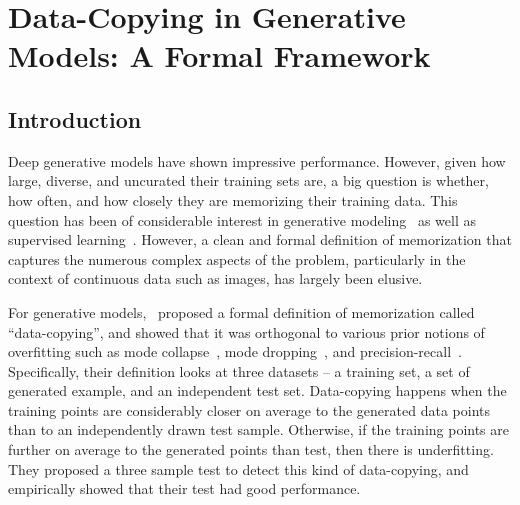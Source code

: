 \graphicspath{{./chapters/chapter4/}}
\newtheorem{theorem}{Theorem}[section]
\newtheorem{proposition}[theorem]{Proposition}
\newtheorem{lemma}[theorem]{Lemma}
\newtheorem{corollary}[theorem]{Corollary}
\newtheorem{definition}[theorem]{Definition}
\newtheorem{assumption}[theorem]{Assumption}
\newtheorem{remark}[theorem]{Remark}

\def\c{cr}
\def\hc{\hat{cr}}
\def\d{\Lambda}
\def\ind{\mathbbm{1}}
\def\oc{Online\_Cluster}
\def\mem{\mathcal M}
\def\E{\mathbb{E}}
\def\R{\mathbb{R}}
\def\O{\mathcal{O}}
\def\calP{\mathcal{P}}
\def\dc{Data\_Copy\_Detect}
\def\a{\kappa}
\def\hq{\widehat{q(B(x, r))}}
\def\alpaca{\epsilon}

\chapter{Data-Copying in Generative Models: A Formal Framework} 

\section{Introduction}

Deep generative models have shown impressive performance. However, given how large, diverse, and uncurated their training sets are, a big question is whether, how often, and how closely they are memorizing their training data. This question has been of considerable interest in generative modeling~\citep{lopez2016revisiting,XHYGSWK18} as well as supervised learning~\citep{BBFST21, Feldman20}. However, a clean and formal definition of memorization that captures the numerous complex aspects of the problem, particularly in the context of continuous data such as images, has largely been elusive.

For generative models,~\cite{MCD2020} proposed a formal definition of memorization called ``data-copying'', and showed that it was orthogonal to various prior notions of overfitting such as mode collapse~\citep{TT20}, mode dropping~\citep{YFWYC20}, and precision-recall~\citep{SBLBG18}. Specifically, their definition looks at three datasets -- a training set, a set of generated example, and an independent test set. Data-copying happens when the training points are considerably closer on average to the generated data points than to an independently drawn test sample. Otherwise, if the training points are further on average to the generated points than test, then there is underfitting. They proposed a three sample test to detect this kind of data-copying, and empirically showed that their test had good performance.

